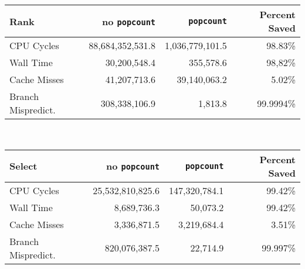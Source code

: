 \begin{tabular}{|l|r|r|r|}
\hline
\textbf{Rank}						& no \texttt{popcount}	& \texttt{popcount}	& Percent Saved \\ \hline
CPU Cycles 				& 88,684,352,531.8	& 1,036,779,101.5	& 98.83\% \\ \hline
Wall Time				& 30,200,548.4		& 355,578.6			& 98,82\% \\ \hline
Cache Misses				& 41,207,713.6		& 39,140,063.2		& 5.02\% \\ \hline
Branch Mispredict.	& 308,338,106.9		& 1,813.8			& 99.9994\% \\ \hline
\end{tabular}\\[5pt]

\begin{tabular}{|l|r|r|r|}
\hline
\textbf{Select}						& no \texttt{popcount}	& \texttt{popcount}	& Percent Saved \\ \hline
CPU Cycles 				& 25,532,810,825.6	& 147,320,784.1	& 99.42\% \\ \hline
Wall Time				& 8,689,736.3		& 50,073.2		& 99.42\% \\ \hline
Cache Misses				& 3,336,871.5		& 3,219,684.4	& 3.51\% \\ \hline
Branch Mispredict.	& 820,076,387.5		& 22,714.9		& 99.997\% \\ \hline
\end{tabular}